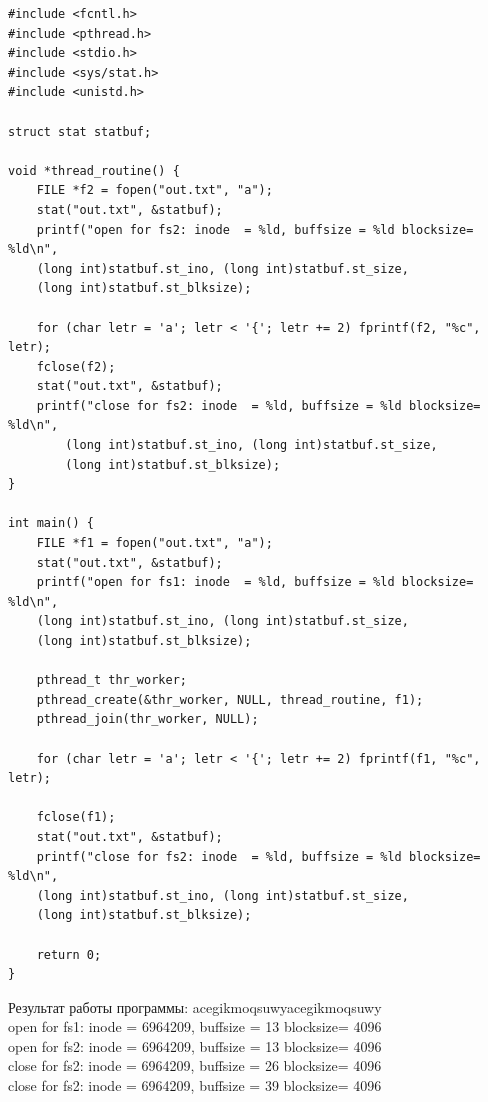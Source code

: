 \begin{lstlisting}[showstringspaces=false]
#include <fcntl.h>
#include <pthread.h>
#include <stdio.h>
#include <sys/stat.h>
#include <unistd.h>

struct stat statbuf;

void *thread_routine() {
	FILE *f2 = fopen("out.txt", "a");
	stat("out.txt", &statbuf);
	printf("open for fs2: inode  = %ld, buffsize = %ld blocksize= %ld\n",
	(long int)statbuf.st_ino, (long int)statbuf.st_size,
	(long int)statbuf.st_blksize);
	
	for (char letr = 'a'; letr < '{'; letr += 2) fprintf(f2, "%c", letr);
	fclose(f2);
	stat("out.txt", &statbuf);
	printf("close for fs2: inode  = %ld, buffsize = %ld blocksize= %ld\n",
		(long int)statbuf.st_ino, (long int)statbuf.st_size,
		(long int)statbuf.st_blksize);
}
	
int main() {
	FILE *f1 = fopen("out.txt", "a");
	stat("out.txt", &statbuf);
	printf("open for fs1: inode  = %ld, buffsize = %ld blocksize= %ld\n",
	(long int)statbuf.st_ino, (long int)statbuf.st_size,
	(long int)statbuf.st_blksize);
	
	pthread_t thr_worker;
	pthread_create(&thr_worker, NULL, thread_routine, f1);
	pthread_join(thr_worker, NULL);
	
	for (char letr = 'a'; letr < '{'; letr += 2) fprintf(f1, "%c", letr);
		
	fclose(f1);
	stat("out.txt", &statbuf);
	printf("close for fs2: inode  = %ld, buffsize = %ld blocksize= %ld\n",
	(long int)statbuf.st_ino, (long int)statbuf.st_size,
	(long int)statbuf.st_blksize);
	
	return 0;
}
\end{lstlisting}
Результат работы программы:\newline
acegikmoqsuwyacegikmoqsuwy \\
open for fs1: inode  = 6964209, buffsize = 13 blocksize= 4096\\
open for fs2: inode  = 6964209, buffsize = 13 blocksize= 4096\\
close for fs2: inode  = 6964209, buffsize = 26 blocksize= 4096\\
close for fs2: inode  = 6964209, buffsize = 39 blocksize= 4096


